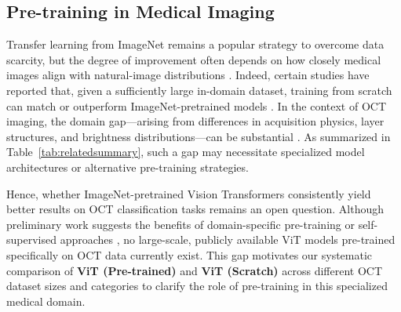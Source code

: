	\subsection{Pre-training in Medical Imaging}
	Transfer learning from ImageNet \cite{34Deng2009,28He2019} remains a popular strategy to overcome data scarcity, but the degree of improvement often depends on how closely medical images align with natural-image distributions \cite{27Raghu2019}. Indeed, certain studies have reported that, given a sufficiently large in-domain dataset, training from scratch can match or outperform ImageNet-pretrained models \cite{28He2019}. In the context of OCT imaging, the domain gap—arising from differences in acquisition physics, layer structures, and brightness distributions—can be substantial \cite{39Takahashi2024}. As summarized in Table~\ref{tab:relatedsummary}, such a gap may necessitate specialized model architectures or alternative pre-training strategies.
	
	Hence, whether ImageNet-pretrained Vision Transformers consistently yield better results on OCT classification tasks remains an open question. Although preliminary work suggests the benefits of domain-specific pre-training or self-supervised approaches \cite{41Ran2021}, no large-scale, publicly available ViT models pre-trained specifically on OCT data currently exist. This gap motivates our systematic comparison of \textbf{ViT (Pre-trained)} and \textbf{ViT (Scratch)} across different OCT dataset sizes and categories to clarify the role of pre-training in this specialized medical domain.
